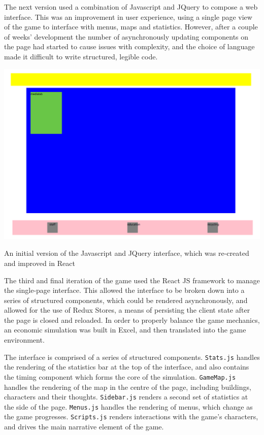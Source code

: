 \documentclass[nofonts,nols,justified,nobib]{tufte-book}
\begin{document}
The next version used a combination of Javascript and JQuery to compose a web interface. This was an improvement in user experience, using a single page view of the game to interface with menus, maps and statistics. However, after a couple of weeks' development the number of asynchronously updating components on the page had started to cause issues with complexity, and the choice of language made it difficult to write structured, legible code.

\begin{marginfigure}
\includegraphics[width=\textwidth]{img/3/prototyping/initial-map.png}
\caption{An initial version of the Javascript and JQuery interface, which was re-created and improved in React }
\end{marginfigure}

The third and final iteration of the game used the React JS framework to manage the single-page interface. This allowed the interface to be broken down into a series of structured components, which could be rendered asynchronously, and allowed for the use of Redux Stores, a means of persisting the client state after the page is closed and reloaded. In order to properly balance the game mechanics, an economic simulation was built in Excel, and then translated into the game environment.

The interface is comprised of a series of structured components. \verb|Stats.js| handles the rendering of the statistics bar at the top of the interface, and also contains the timing component which forms the core of the simulation. \verb|GameMap.js| handles the rendering of the map in the centre of the page, including buildings, characters and their thoughts. \verb|Sidebar.js| renders a second set of statistics at the side of the page. \verb|Menus.js| handles the rendering of menus, which change as the game progresses. \verb|Scripts.js| renders interactions with the game's characters, and drives the main narrative element of the game.
\end{document}
